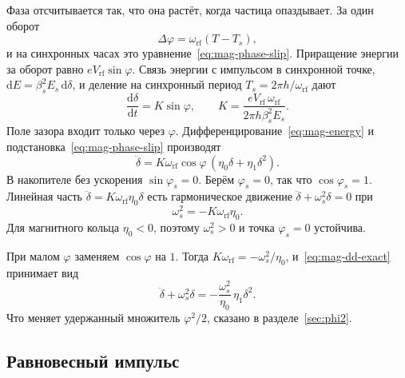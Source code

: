 \documentclass[aps,pra,preprint,a4paper,amsmath,amssymb,longbibliography]{revtex4-2}
\begin{document}
Фаза отсчитывается так, что она растёт, когда частица опаздывает. За один оборот
\begin{equation}
\label{eq:mag-phase-map}
\Delta\varphi=\omega_{\mathrm{rf}}(T-T_s),
\end{equation}
и на синхронных часах это уравнение~\eqref{eq:mag-phase-slip}. Приращение энергии за оборот равно $eV_{\mathrm{rf}}\sin\varphi$. Связь энергии с импульсом в синхронной точке, $\mathrm{d}E=\beta_s^2 E_s\,\mathrm{d}\delta$, и деление на синхронный период $T_s=2\pi h/\omega_{\mathrm{rf}}$ дают
\begin{equation}
\label{eq:mag-energy}
\frac{\mathrm{d}\delta}{\mathrm{d}t}=K\sin\varphi,
\qquad
K=\frac{eV_{\mathrm{rf}}\,\omega_{\mathrm{rf}}}{2\pi h\beta_s^2 E_s}.
\end{equation}
Поле зазора входит только через $\varphi$. Дифференцирование~\eqref{eq:mag-energy} и подстановка~\eqref{eq:mag-phase-slip} производят
\begin{equation}
\label{eq:mag-dd-exact}
\ddot\delta
=K\omega_{\mathrm{rf}}\cos\varphi\,(\eta_0\delta+\eta_1\delta^2).
\end{equation}
В накопителе без ускорения $\sin\varphi_s=0$. Берём $\varphi_s=0$, так что $\cos\varphi_s=1$. Линейная часть $\ddot\delta=K\omega_{\mathrm{rf}}\eta_0\delta$ есть гармоническое движение $\ddot\delta+\omega_s^2\delta=0$ при
\begin{equation}
\label{eq:mag-ws2}
\omega_s^2=-K\omega_{\mathrm{rf}}\eta_0.
\end{equation}
Для магнитного кольца $\eta_0<0$, поэтому $\omega_s^2>0$ и точка $\varphi_s=0$ устойчива.

При малом $\varphi$ заменяем $\cos\varphi$ на $1$. Тогда $K\omega_{\mathrm{rf}}=-\omega_s^2/\eta_0$, и~\eqref{eq:mag-dd-exact} принимает вид
\begin{equation}
\label{eq:mag-osc}
\ddot\delta+\omega_s^2\delta
=-\frac{\omega_s^2}{\eta_0}\,\eta_1\delta^2.
\end{equation}
Что меняет удержанный множитель $\varphi^2/2$, сказано в разделе~\ref{sec:phi2}.

\subsection{Равновесный импульс}
\label{sec:equilibrium}
\end{document}
